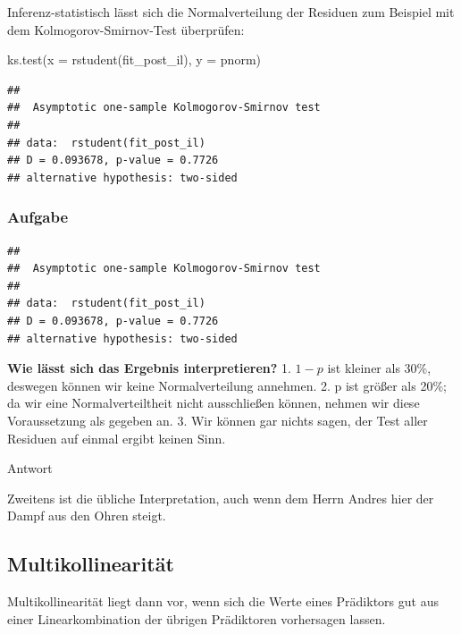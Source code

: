 \documentclass[
]{book}
\newenvironment{Shaded}{\begin{snugshade}}{\end{snugshade}}
\newcommand{\AttributeTok}[1]{\textcolor[rgb]{0.77,0.63,0.00}{#1}}
\newcommand{\FunctionTok}[1]{\textcolor[rgb]{0.00,0.00,0.00}{#1}}
\newcommand{\NormalTok}[1]{#1}
\newcommand{\StringTok}[1]{\textcolor[rgb]{0.31,0.60,0.02}{#1}}
\begin{document}
Inferenz-statistisch lässt sich die Normalverteilung der Residuen zum Beispiel mit dem Kolmogorov-Smirnov-Test überprüfen:

\begin{Shaded}
\begin{Highlighting}[]
\FunctionTok{ks.test}\NormalTok{(}\AttributeTok{x =} \FunctionTok{rstudent}\NormalTok{(fit\_post\_il),}
        \AttributeTok{y =} \StringTok{\textquotesingle{}pnorm\textquotesingle{}}\NormalTok{)}
\end{Highlighting}
\end{Shaded}

\begin{verbatim}
## 
##  Asymptotic one-sample Kolmogorov-Smirnov test
## 
## data:  rstudent(fit_post_il)
## D = 0.093678, p-value = 0.7726
## alternative hypothesis: two-sided
\end{verbatim}

\hypertarget{aufgabe-5}{%
\subsubsection{Aufgabe}\label{aufgabe-5}}

\begin{verbatim}
## 
##  Asymptotic one-sample Kolmogorov-Smirnov test
## 
## data:  rstudent(fit_post_il)
## D = 0.093678, p-value = 0.7726
## alternative hypothesis: two-sided
\end{verbatim}

\textbf{Wie lässt sich das Ergebnis interpretieren?}
1. \(1-p\) ist kleiner als 30\%, deswegen können wir keine Normalverteilung annehmen.
2. p ist größer als 20\%; da wir eine Normalverteiltheit nicht ausschließen können, nehmen wir diese Voraussetzung als gegeben an.
3. Wir können gar nichts sagen, der Test aller Residuen auf einmal ergibt keinen Sinn.

Antwort

Zweitens ist die übliche Interpretation, auch wenn dem Herrn Andres hier der Dampf aus den Ohren steigt.

\hypertarget{multikollinearituxe4t}{%
\subsection{Multikollinearität}\label{multikollinearituxe4t}}

Multikollinearität liegt dann vor, wenn sich die Werte eines Prädiktors gut aus einer Linearkombination
der übrigen Prädiktoren vorhersagen lassen.
\end{document}
